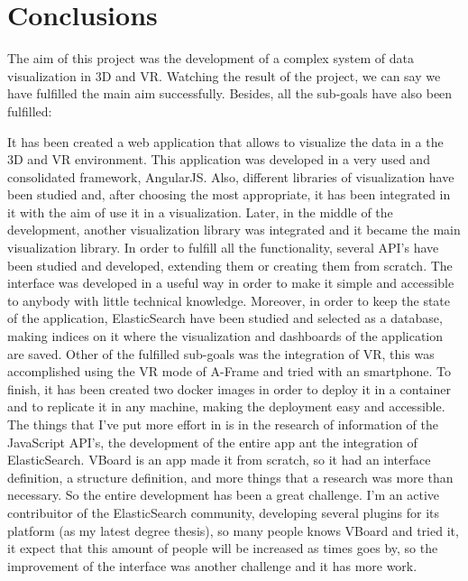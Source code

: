 \documentclass[a4paper, 12pt]{book}
\begin{document}

\cleardoublepage
\chapter{Conclusions}
\label{chap:conclusions}
The aim of this project was the development of a complex system of data visualization in 3D and VR. Watching the result of the project, we can say we have fulfilled the main aim successfully. Besides, all the sub-goals have also been fulfilled:

It has been created a web application that allows to visualize the data in a the 3D and VR environment. This application was developed in a very used and consolidated framework, AngularJS. Also, different libraries of visualization have been studied and, after choosing the most appropriate, it has been integrated in it with the aim of use it in a visualization. Later, in the middle of the development, another visualization library was integrated and it became the main visualization library. In order to fulfill all the functionality, several API's have been studied and developed, extending them or creating them from scratch. The interface was developed in a useful way in order to make it simple and accessible to anybody with little technical knowledge. Moreover, in order to keep the state of the application, ElasticSearch have been studied and selected as a database, making indices on it where the visualization and dashboards of the application are saved. Other of the fulfilled sub-goals was the integration of VR, this was accomplished using the VR mode of A-Frame and tried with an smartphone. To finish, it has been created two docker images in order to deploy it in a container and to replicate it in any machine, making the deployment easy and accessible.\\

The things that I’ve put more effort in is in the research of information of the JavaScript API's, the development of the entire app ant the integration of ElasticSearch. VBoard is an app made it from scratch, so it had an interface definition, a structure definition, and more things that a research was more than necessary. So the entire development has been a great challenge. I'm an active contribuitor of the ElasticSearch community, developing several plugins for its platform (as my latest degree thesis), so many people knows VBoard and tried it, it expect that this amount of people will be increased as times goes by, so the improvement of the interface was another challenge and it has more work.
\end{document}
